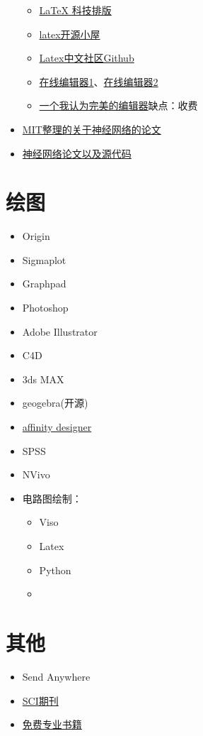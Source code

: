 \documentclass[UTF8,oneside]{ctexbook}
\begin{document}
\begin{itemize}
\begin{itemize}
		      \item \href{http://math.ecnu.edu.cn/~jypan/Teaching/Latex/}{LaTeX 科技排版}
		      \item \href{http://www.latexstudio.net/}{latex开源小屋}
		      \item \href{https://github.com/latexstudio}{Latex中文社区Github}
		      \item \href{https://www.overleaf.com/login}{在线编辑器1}、\href{http://www.math.org.cn/tex/index.html}{在线编辑器2}
		      \item \href{http://www.bakoma-tex.com}{一个我认为完美的编辑器}\quad 缺点：收费
	      \end{itemize}
	\item \href{https://www.stateoftheart.ai}{MIT整理的关于神经网络的论文}
	\item \href{https://github.com/lonelybag/pwc}{神经网络论文以及源代码}
\end{itemize}

\section{绘图}
\begin{itemize}
	\item Origin
	\item Sigmaplot
	\item Graphpad
	\item Photoshop
	\item Adobe Illustrator
	\item C4D
	\item 3ds MAX
	\item geogebra(开源)
	\item \href{https://affinity.serif.com/zh-cn/designer/}{affinity designer}
	\item SPSS
	\item NVivo
	\item 电路图绘制：
	      \begin{itemize}
		      \item Viso
		      \item Latex
		      \item Python
		      \item
	      \end{itemize}
\end{itemize}

\section{其他}
\begin{itemize}
	\item Send Anywhere
	\item \href{https://www.scimagojr.com}{SCI期刊}
	\item \href{http://libgen.io}{免费专业书籍}
\end{itemize}
\end{document}
